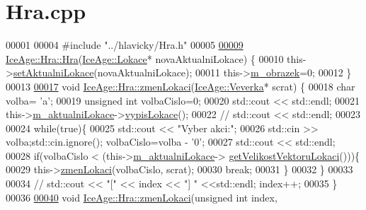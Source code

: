 \hypertarget{Hra_8cpp_source}{}\section{Hra.\+cpp}
\label{Hra_8cpp_source}

\begin{DoxyCode}
00001 
00004 \textcolor{preprocessor}{#include "../hlavicky/Hra.h"}
00005 
\hypertarget{Hra_8cpp_source.tex_l00009}{}\hyperlink{classIceAge_1_1Hra_ae4538962681c44e099fac261639e4063}{00009} \hyperlink{classIceAge_1_1Hra_ae4538962681c44e099fac261639e4063}{IceAge::Hra::Hra}(\hyperlink{classIceAge_1_1Lokace}{IceAge::Lokace}* novaAktualniLokace) \{
00010     this->\hyperlink{classIceAge_1_1Hra_a1fad6152ce71d1e2912e538f3c330d29}{setAktualniLokace}(novaAktualniLokace);
00011     this->\hyperlink{classIceAge_1_1Hra_aca22307d63587a6fc2f835fdf8b28a21}{m\_obrazek}=0;
00012 \}
00013 
\hypertarget{Hra_8cpp_source.tex_l00017}{}\hyperlink{classIceAge_1_1Hra_a9429d4476f187d8a80dde5944704fab7}{00017} \textcolor{keywordtype}{void} \hyperlink{classIceAge_1_1Hra_a9429d4476f187d8a80dde5944704fab7}{IceAge::Hra::zmenLokaci}(\hyperlink{classIceAge_1_1Veverka}{IceAge::Veverka}* scrat) \{
00018     \textcolor{keywordtype}{char} volba= \textcolor{charliteral}{'a'};
00019     \textcolor{keywordtype}{unsigned} \textcolor{keywordtype}{int} volbaCislo=0;
00020     std::cout << std::endl;
00021     this->\hyperlink{classIceAge_1_1Hra_a2d006812c29f093c47054be30c8b7591}{m\_aktualniLokace}->\hyperlink{classIceAge_1_1Lokace_af4a779823955954dd2c68331a57193c9}{vypisLokace}();
00022 \textcolor{comment}{//    std::cout << std::endl;}
00023 
00024     \textcolor{keywordflow}{while}(\textcolor{keyword}{true})\{
00025         std::cout << \textcolor{stringliteral}{"Vyber akci:"};
00026         std::cin >> volba;std::cin.ignore(); volbaCislo=volba - \textcolor{charliteral}{'0'};
00027         std::cout << std::endl;
00028         \textcolor{keywordflow}{if}(volbaCislo < (this->\hyperlink{classIceAge_1_1Hra_a2d006812c29f093c47054be30c8b7591}{m\_aktualniLokace}->
      \hyperlink{classIceAge_1_1Lokace_ad2c476dac4ae7832795995ed90fcc591}{getVelikostVektoruLokaci}()))\{
00029             this->\hyperlink{classIceAge_1_1Hra_a9429d4476f187d8a80dde5944704fab7}{zmenLokaci}(volbaCislo, scrat);
00030             \textcolor{keywordflow}{break};
00031         \}
00032     \}
00033 
00034 \textcolor{comment}{//    std::cout << "[" << index << "] " <<std::endl; index++;}
00035 \}
00036 
\hypertarget{Hra_8cpp_source.tex_l00040}{}\hyperlink{classIceAge_1_1Hra_ab22ae41ab25a957787cc5f11569e20f7}{00040} \textcolor{keywordtype}{void} \hyperlink{classIceAge_1_1Hra_a9429d4476f187d8a80dde5944704fab7}{IceAge::Hra::zmenLokaci}(\textcolor{keywordtype}{unsigned} \textcolor{keywordtype}{int} index, 

\end{DoxyCode}
